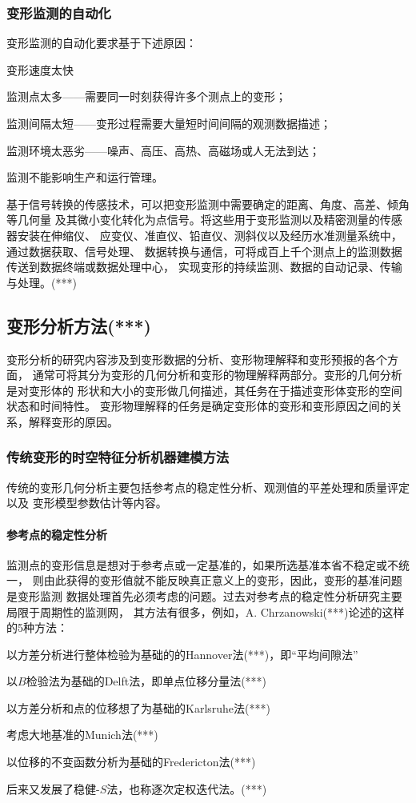 \subsubsection{变形监测的自动化}
变形监测的自动化要求基于下述原因：
\begin{asparaitem}[$\bullet$]
\item 变形速度太快
\item 监测点太多——需要同一时刻获得许多个测点上的变形；
\item 监测间隔太短——变形过程需要大量短时间间隔的观测数据描述；
\item 监测环境太恶劣——噪声、高压、高热、高磁场或人无法到达；
\item 监测不能影响生产和运行管理。
\end{asparaitem}
基于信号转换的传感技术，可以把变形监测中需要确定的距离、角度、高差、倾角等几何量
及其微小变化转化为点信号。将这些用于变形监测以及精密测量的传感器安装在伸缩仪、
应变仪、准直仪、铅直仪、测斜仪以及经历水准测量系统中，通过数据获取、信号处理、
数据转换与通信，可将成百上千个测点上的监测数据传送到数据终端或数据处理中心，
实现变形的持续监测、数据的自动记录、传输与处理。(***)

\subsection{变形分析方法(***)}
变形分析的研究内容涉及到变形数据的分析、变形物理解释和变形预报的各个方面，
通常可将其分为变形的几何分析和变形的物理解释两部分。变形的几何分析是对变形体的
形状和大小的变形做几何描述，其任务在于描述变形体变形的空间状态和时间特性。
变形物理解释的任务是确定变形体的变形和变形原因之间的关系，解释变形的原因。

\subsubsection{传统变形的时空特征分析机器建模方法}
传统的变形几何分析主要包括参考点的稳定性分析、观测值的平差处理和质量评定以及
变形模型参数估计等内容。
\paragraph*{参考点的稳定性分析} 
监测点的变形信息是想对于参考点或一定基准的，如果所选基准本省不稳定或不统一，
则由此获得的变形值就不能反映真正意义上的变形，因此，变形的基准问题是变形监测
数据处理首先必须考虑的问题。过去对参考点的稳定性分析研究主要局限于周期性的监测网，
其方法有很多，例如，A. Chrzanowski(***)论述的这样的5种方法：
\begin{asparaitem}[$\bullet$]
\item 以方差分析进行整体检验为基础的的Hannover法(***)，即“平均间隙法”
\item 以$B$检验法为基础的Delft法，即单点位移分量法(***)
\item 以方差分析和点的位移想了为基础的Karlsruhe法(***)
\item 考虑大地基准的Munich法(***)
\item 以位移的不变函数分析为基础的Fredericton法(***)
\end{asparaitem}
后来又发展了稳健-$S$法，也称逐次定权迭代法。(***)
